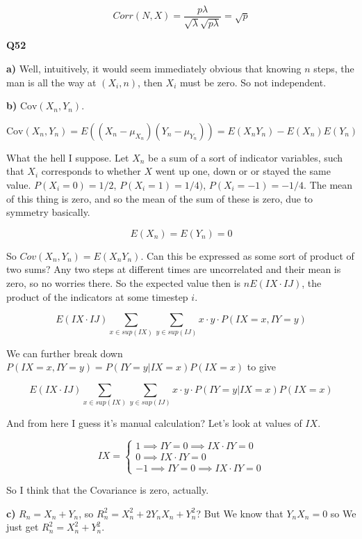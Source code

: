 \documentclass{article}
\begin{document}
			\[ Corr(N, X) = \frac{p\lambda}{\sqrt{\lambda}\sqrt{p\lambda}} = \sqrt{p} \]
			
			\hfill
			
		\textbf{Q52}
		
			\textbf{a)} Well, intuitively, it would seem immediately obvious that knowing $n$ steps, the man is all the way at $(X_i, n)$, then $X_i$ must be zero. So not independent.
			
			\textbf{b)} $\text{Cov}(X_n, Y_n)$.
			
			\[ \text{Cov}(X_n, Y_n) = E((X_n - \mu_{X_n})(Y_n - \mu_{Y_n})) = E(X_nY_n) - E(X_n)E(Y_n) \]
			
			What the hell I suppose. Let $X_n$ be a sum of a sort of indicator variables, such that $X_i$ corresponds to whether $X$ went up one, down or or stayed the same value. $P(X_i = 0)= 1/2$, $P(X_i = 1) = 1/4)$, $P(X_i = -1) = -1/4$. The mean of this thing is zero, and so the mean of the sum of these is zero, due to symmetry basically.
			
			\[ E(X_n) = E(Y_n) = 0 \]
			
			So $Cov(X_n, Y_n) = E(X_nY_n)$. Can this be expressed as some sort of product of two sums? Any two steps at different times are uncorrelated and their mean is zero, so no worries there. So the expected value then is $nE(IX\cdot IJ)$, the product of the indicators at some timestep $i$.
			
			\[ E(IX\cdot IJ) \sum_{x\in sup(IX)}\sum_{y\in sup(IJ)} x\cdot y\cdot P(IX=x, IY=y) \]
			
			We can further break down $P(IX=x, IY=y) = P(IY=y|IX=x)P(IX=x)$ to give
			
			\[ E(IX\cdot IJ) \sum_{x\in sup(IX)}\sum_{y\in sup(IJ)} x\cdot y\cdot P(IY=y|IX=x)P(IX=x) \]
			
			And from here I guess it's manual calculation? Let's look at values of $IX$. 
			
			\[ IX =  \begin{cases} 1\implies IY = 0\implies IX\cdot IY=0 \\
									0 \implies IX\cdot IY=0\\
									-1 \implies IY=0 \implies IX\cdot IY=0
					\end{cases}\]	
					
			So I think that the Covariance is zero, actually.
			
			\textbf{c)} $R_n = X_n + Y_n$, so $R^2_n = X^2_n + 2Y_nX_n + Y^2_n$? But We know that $Y_nX_n = 0$ so We just get $R^2_n = X^2_n + Y^2_n$.
			
\end{document}

